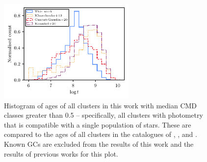 \begin{figure}[t]
   \centering
   \includegraphics[width=0.6\textwidth]{fig/c3/fig_results_age_histogram.pdf}
   \caption[Histogram of ages of all clusters in this work with median CMD classes greater than 0]{Histogram of ages of all clusters in this work with median CMD classes greater than 0.5 -- specifically, all clusters with photometry that is compatible with a single population of stars. These are compared to the ages of all clusters in the catalogues of \cite{kharchenko_global_2013}, \cite{kounkel_untangling_2020}, and \cite{cantat-gaudin_painting_2020}. Known GCs are excluded from the results of this work and the results of previous works for this plot.}%
   \label{c3:fig:age_histogram}
\end{figure}

